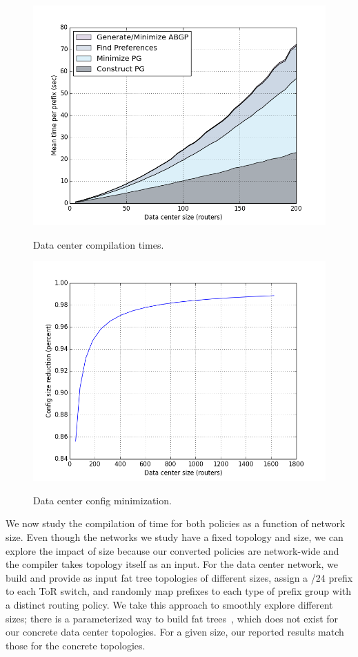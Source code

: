 \begin{figure}[t!]
\centering
\includegraphics[width=\columnwidth]{figures/compilation-times-backbone.png}
\label{fig:compilation-times-dc}
\caption{Data center compilation times.}
\end{figure}

\begin{figure}[t!]
\centering
\includegraphics[width=\columnwidth]{figures/config-compression-dc.png}
\label{fig:compilation-compression-dc}
\caption{Data center config minimization.}
\end{figure}

We now study the compilation of time for both policies as a function of network size. Even though the networks we study have a fixed topology and size, we can explore the impact of size because our converted policies are network-wide and the compiler takes topology itself as an input. For the data center network, we build and provide as input fat tree topologies of different sizes, assign a /24 prefix to each ToR switch, and randomly map prefixes to each type of prefix group with a distinct routing policy. We take this approach to smoothly explore different sizes; there is a parameterized way to build fat trees~\cite{fattree}, which does not exist for our concrete data center topologies. For a given size, our reported results match those for the concrete topologies.

